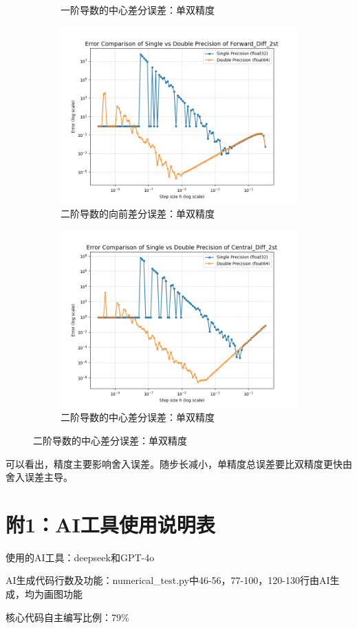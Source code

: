 \documentclass[12pt, a4paper]{article}
\begin{document}
\begin{figure}[htbp]
\begin{subfigure}[b]{0.45\textwidth}
        \caption{一阶导数的中心差分误差：单双精度}
        \label{fig: ECC1}
    \end{subfigure}
    \vspace{0.5cm}
    \centering
    \begin{subfigure}[b]{0.45\textwidth} 
        \centering
        \includegraphics[width=\textwidth]{./pictures/Error Comparison of Single vs Double Precision of Forward_Diff_2st.png} 
        \caption{二阶导数的向前差分误差：单双精度}
        \label{fig: ECF2}
    \end{subfigure}
    \hfill
    \begin{subfigure}[b]{0.45\textwidth} 
        \centering
        \includegraphics[width=\textwidth]{./pictures/Error Comparison of Single vs Double Precision of Central_Diff_2st.png} 
        \caption{二阶导数的中心差分误差：单双精度}
        \label{fig: ECC2}
    \end{subfigure}
\end{figure}

可以看出，精度主要影响舍入误差。随步长减小，单精度总误差要比双精度更快由舍入误差主导。

\section*{附1：AI工具使用说明表}
使用的AI工具：deepseek和GPT-4o

AI生成代码行数及功能：numerical\_test.py中46-56，77-100，120-130行由AI生成，均为画图功能

核心代码自主编写比例：79\%
\end{document}
